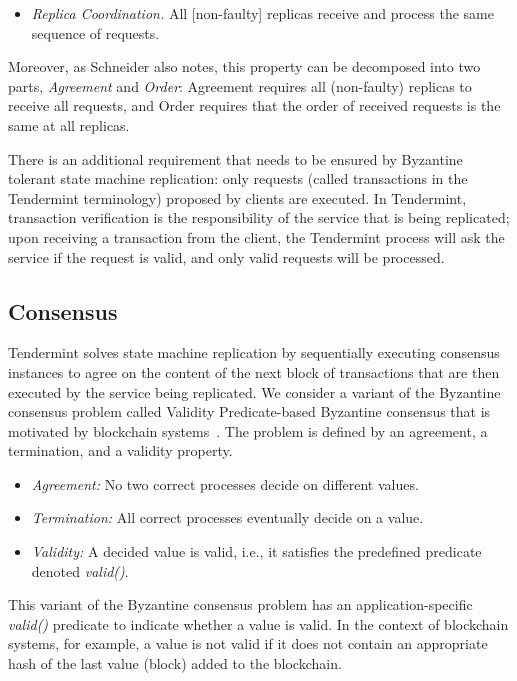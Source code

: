 \begin{itemize}
	\item \emph{Replica Coordination.} All [non-faulty] replicas receive
	and process the same sequence of requests.
\end{itemize}

Moreover, as Schneider also notes, this property can be decomposed into
two parts, \emph{Agreement} and \emph{Order}: Agreement
requires all (non-faulty) replicas to receive all
requests, and Order requires that the order of received requests
is the same at all replicas.

There is an additional requirement that needs to be ensured by Byzantine tolerant state machine replication:
only requests (called transactions in the Tendermint terminology) proposed by clients are executed. In Tendermint, transaction verification is the responsibility of the service that is 
being replicated; upon receiving a transaction from the client, the Tendermint process will ask the service if the request is valid, and only valid 
requests will be processed. 

 \subsection{Consensus}
 \label{sec:consensus}

Tendermint solves state machine replication by sequentially executing consensus instances to agree on the content of the next block of transactions that are then executed by the service being replicated. We consider a variant of the Byzantine consensus problem called Validity Predicate-based Byzantine consensus that is motivated by blockchain
systems~\cite{GLR17:red-belly-bc}. The problem is defined by an agreement, a termination, and a validity
property.

 \begin{itemize}
 \item \emph{Agreement:} No two correct processes decide on different values.
 \item \emph{Termination:} All correct processes eventually decide on a value.
 \item \emph{Validity:} A decided value is valid, i.e., it satisfies the predefined predicate denoted \emph{valid()}.
 \end{itemize}

 This variant of the Byzantine consensus problem has an application-specific \emph{valid()} predicate to indicate whether a value is valid. In the context of blockchain systems, for example, a value is not valid if it does not contain an appropriate hash of the last value (block) added to the blockchain.
